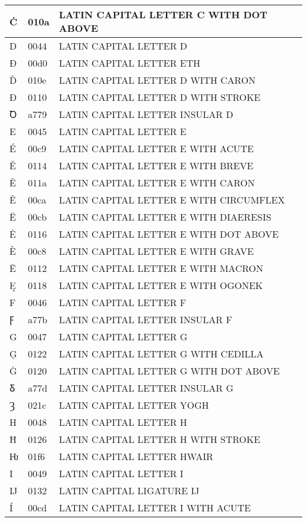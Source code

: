 \documentclass[12pt,letterpaper,openany]{book}
\begin{document}
\begin{center}
\begin{supertabular}{|m{0.25in}|m{0.5in}|m{4in}|}
Ċ & 010a & LATIN CAPITAL LETTER C WITH DOT ABOVE\\\hline
D & 0044 & LATIN CAPITAL LETTER D\\\hline
Ð & 00d0 & LATIN CAPITAL LETTER ETH\\\hline
Ď & 010e & LATIN CAPITAL LETTER D WITH CARON\\\hline
Đ & 0110 & LATIN CAPITAL LETTER D WITH STROKE\\\hline
Ꝺ & a779 & LATIN CAPITAL LETTER INSULAR D\\\hline
E & 0045 & LATIN CAPITAL LETTER E\\\hline
É & 00c9 & LATIN CAPITAL LETTER E WITH ACUTE\\\hline
Ĕ & 0114 & LATIN CAPITAL LETTER E WITH BREVE\\\hline
Ě & 011a & LATIN CAPITAL LETTER E WITH CARON\\\hline
Ê & 00ca & LATIN CAPITAL LETTER E WITH CIRCUMFLEX\\\hline
Ë & 00cb & LATIN CAPITAL LETTER E WITH DIAERESIS\\\hline
Ė & 0116 & LATIN CAPITAL LETTER E WITH DOT ABOVE\\\hline
È & 00c8 & LATIN CAPITAL LETTER E WITH GRAVE\\\hline
Ē & 0112 & LATIN CAPITAL LETTER E WITH MACRON\\\hline
Ę & 0118 & LATIN CAPITAL LETTER E WITH OGONEK\\\hline
F & 0046 & LATIN CAPITAL LETTER F\\\hline
Ꝼ & a77b & LATIN CAPITAL LETTER INSULAR F\\\hline
G & 0047 & LATIN CAPITAL LETTER G\\\hline
Ģ & 0122 & LATIN CAPITAL LETTER G WITH CEDILLA\\\hline
Ġ & 0120 & LATIN CAPITAL LETTER G WITH DOT ABOVE\\\hline
Ᵹ & a77d & LATIN CAPITAL LETTER INSULAR G\\\hline
Ȝ & 021c & LATIN CAPITAL LETTER YOGH\\\hline
H & 0048 & LATIN CAPITAL LETTER H\\\hline
Ħ & 0126 & LATIN CAPITAL LETTER H WITH STROKE\\\hline
Ƕ & 01f6 & LATIN CAPITAL LETTER HWAIR\\\hline
I & 0049 & LATIN CAPITAL LETTER I\\\hline
Ĳ & 0132 & LATIN CAPITAL LIGATURE IJ\\\hline
Í & 00cd & LATIN CAPITAL LETTER I WITH ACUTE\\\hline

\end{supertabular}
\end{center}
\end{document}
